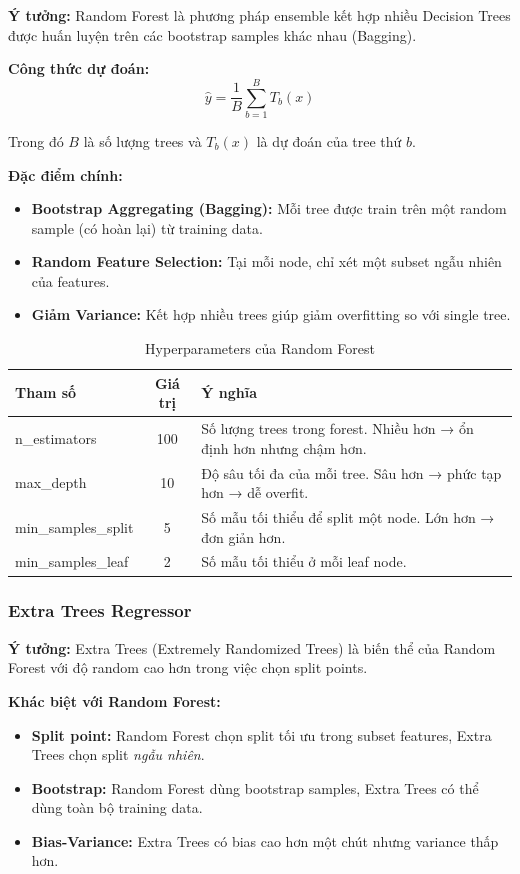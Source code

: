 \documentclass[12pt,a4paper]{article}
\begin{document}
\textbf{Ý tưởng:} Random Forest là phương pháp ensemble kết hợp nhiều Decision Trees được huấn luyện trên các bootstrap samples khác nhau (Bagging).

\textbf{Công thức dự đoán:}
\begin{equation}
\hat{y} = \frac{1}{B} \sum_{b=1}^{B} T_b(x)
\end{equation}

Trong đó $B$ là số lượng trees và $T_b(x)$ là dự đoán của tree thứ $b$.

\textbf{Đặc điểm chính:}
\begin{itemize}
    \item \textbf{Bootstrap Aggregating (Bagging):} Mỗi tree được train trên một random sample (có hoàn lại) từ training data.
    \item \textbf{Random Feature Selection:} Tại mỗi node, chỉ xét một subset ngẫu nhiên của features.
    \item \textbf{Giảm Variance:} Kết hợp nhiều trees giúp giảm overfitting so với single tree.
\end{itemize}

\begin{table}[H]
\centering
\caption{Hyperparameters của Random Forest}
\begin{tabular}{|l|c|p{7cm}|}
\hline
\textbf{Tham số} & \textbf{Giá trị} & \textbf{Ý nghĩa} \\
\hline
n\_estimators & 100 & Số lượng trees trong forest. Nhiều hơn → ổn định hơn nhưng chậm hơn. \\
\hline
max\_depth & 10 & Độ sâu tối đa của mỗi tree. Sâu hơn → phức tạp hơn → dễ overfit. \\
\hline
min\_samples\_split & 5 & Số mẫu tối thiểu để split một node. Lớn hơn → đơn giản hơn. \\
\hline
min\_samples\_leaf & 2 & Số mẫu tối thiểu ở mỗi leaf node. \\
\hline
\end{tabular}
\end{table}

\subsubsection{Extra Trees Regressor}

\textbf{Ý tưởng:} Extra Trees (Extremely Randomized Trees) là biến thể của Random Forest với độ random cao hơn trong việc chọn split points.

\textbf{Khác biệt với Random Forest:}
\begin{itemize}
    \item \textbf{Split point:} Random Forest chọn split tối ưu trong subset features, Extra Trees chọn split \textit{ngẫu nhiên}.
    \item \textbf{Bootstrap:} Random Forest dùng bootstrap samples, Extra Trees có thể dùng toàn bộ training data.
    \item \textbf{Bias-Variance:} Extra Trees có bias cao hơn một chút nhưng variance thấp hơn.
\end{itemize}
\end{document}
